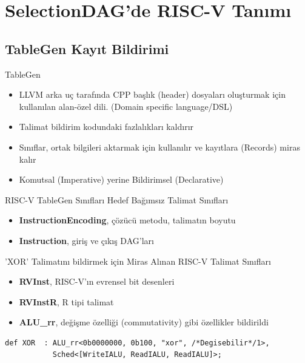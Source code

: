 \section{SelectionDAG'de RISC-V Tanımı}
\subsection{TableGen Kayıt Bildirimi}
\begin{frame}{TableGen}
    \begin{itemize}
        \item LLVM arka uç tarafında CPP başlık (header) dosyaları oluşturmak için kullanılan alan-özel dili. (Domain specific language/DSL)
        \item
        Talimat bildirim kodundaki fazlalıkları kaldırır
        \item
        Sınıflar, ortak bilgileri aktarmak için kullanılır ve kayıtlara (Records) miras kalır
        \item
        Komutsal (Imperative) yerine Bildirimsel (Declarative)
    \end{itemize}
\end{frame}

\begin{frame}[fragile]{RISC-V TableGen Sınıfları}
Hedef Bağımsız Talimat Sınıfları
    \begin{itemize}
        \item \textbf{InstructionEncoding}, çözücü metodu, talimatın boyutu
        \item
        \textbf{Instruction}, giriş ve çıkış DAG'ları
    \end{itemize}

'XOR' Talimatını bildirmek için Miras Alınan RISC-V Talimat Sınıfları
    \begin{itemize}
        \item \textbf{RVInst}, RISC-V'ın evrensel bit desenleri
        \item
        \textbf{RVInstR}, R tipi talimat
        \item
        \textbf{ALU\_rr}, değişme özelliği (commutativity) gibi özellikler bildirildi
    \end{itemize}
\begin{lstlisting}
def XOR  : ALU_rr<0b0000000, 0b100, "xor", /*Degisebilir*/1>,
           Sched<[WriteIALU, ReadIALU, ReadIALU]>;
\end{lstlisting}
\end{frame}


